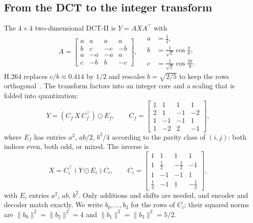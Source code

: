 \subsection{From the DCT to the integer transform}
The $4\times4$ two-dimensional DCT-II is $Y=AXA^{\top}$ with
\begin{equation}
A=\begin{bmatrix}a&a&a&a\\ b&c&-c&-b\\ a&-a&-a&a\\ c&-b&b&-c\end{bmatrix},\quad
\begin{aligned}a&=\tfrac12,\\ b&=\tfrac{1}{\sqrt2}\cos\tfrac{\pi}{8},\\ c&=\tfrac{1}{\sqrt2}\cos\tfrac{3\pi}{8}.\end{aligned}
\end{equation}
H.264 replaces $c/b\approx0.414$ by $1/2$ and rescales $b=\sqrt{2/5}$ to keep the rows orthogonal~\cite{malvar2003transform}. The transform factors into an integer core and a scaling that is folded into quantization:
\begin{equation}
Y=\left(C_f\,X\,C_f^{\top}\right)\odot E_f,\qquad
C_f=\begin{bmatrix}1&1&1&1\\2&1&-1&-2\\1&-1&-1&1\\1&-2&2&-1\end{bmatrix},
\end{equation}
where $E_f$ has entries $a^2$, $ab/2$, $b^2/4$ according to the parity class of $(i,j)$: both indices even, both odd, or mixed. The inverse is
\begin{equation}
X=C_i^{\top}\left(Y\odot E_i\right)C_i,\qquad
C_i=\begin{bmatrix}1&1&1&1\\1&\tfrac12&-\tfrac12&-1\\1&-1&-1&1\\\tfrac12&-1&1&-\tfrac12\end{bmatrix},
\label{eq:inverse}
\end{equation}
with $E_i$ entries $a^2$, $ab$, $b^2$. Only additions and shifts are needed, and encoder and decoder match exactly. We write $b_0,\dots,b_3$ for the rows of $C_i$; their squared norms are $\|b_0\|^2=\|b_2\|^2=4$ and $\|b_1\|^2=\|b_3\|^2=5/2$.

